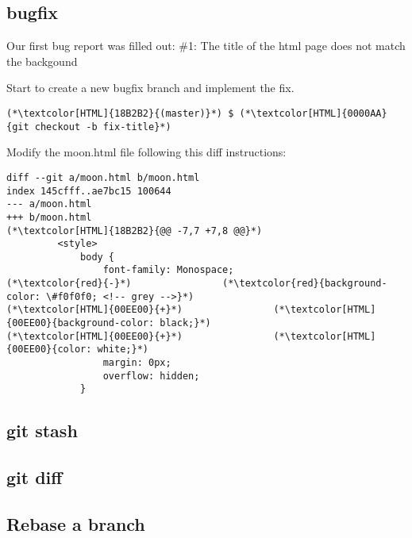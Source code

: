 \subsection{bugfix}
\begin{frame}[fragile]
    \subslidetitle

Our first bug report was filled out:
\newline \vspace{1em}
\#1: The title of the html page does not match the backgound

Start to create a new bugfix branch and implement the fix.
\begin{lstlisting}
(*\textcolor[HTML]{18B2B2}{(master)}*) $ (*\textcolor[HTML]{0000AA}{git checkout -b fix-title}*)
\end{lstlisting}

Modify the moon.html file following this diff instructions:
\begin{lstlisting}
diff --git a/moon.html b/moon.html
index 145cfff..ae7bc15 100644
--- a/moon.html
+++ b/moon.html
(*\textcolor[HTML]{18B2B2}{@@ -7,7 +7,8 @@}*)
         <style>
             body {
                 font-family: Monospace;
(*\textcolor{red}{-}*)                (*\textcolor{red}{background-color: \#f0f0f0; <!-- grey -->}*)
(*\textcolor[HTML]{00EE00}{+}*)                (*\textcolor[HTML]{00EE00}{background-color: black;}*)
(*\textcolor[HTML]{00EE00}{+}*)                (*\textcolor[HTML]{00EE00}{color: white;}*)
                 margin: 0px;
                 overflow: hidden;
             }
\end{lstlisting}
\end{frame}

\subsection{git stash}
\begin{frame}[fragile]
    \subslidetitle
\end{frame}

\subsection{git diff}
\begin{frame}[fragile]
    \subslidetitle
\end{frame}

\subsection{Rebase a branch}
\begin{frame}[fragile]
    \subslidetitle
\end{frame}

